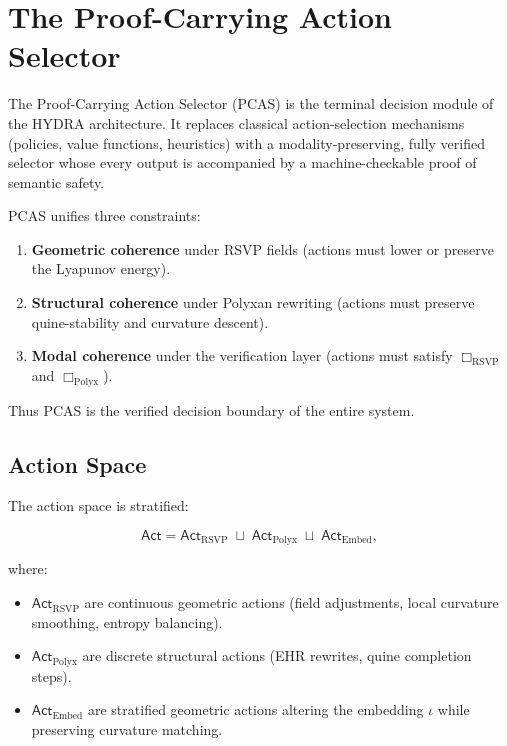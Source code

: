 \chapter{The Proof-Carrying Action Selector}
\label{ch:50}

The Proof-Carrying Action Selector (PCAS) is the terminal decision module of the
HYDRA architecture.  
It replaces classical action-selection mechanisms (policies, value functions,
heuristics) with a modality-preserving, fully verified selector whose every
output is accompanied by a machine-checkable proof of semantic safety.

PCAS unifies three constraints:

\begin{enumerate}
  \item \textbf{Geometric coherence} under RSVP fields  
        (actions must lower or preserve the Lyapunov energy).
  \item \textbf{Structural coherence} under Polyxan rewriting  
        (actions must preserve quine-stability and curvature descent).
  \item \textbf{Modal coherence} under the verification layer  
        (actions must satisfy $\Box_{\mathrm{RSVP}}$ and $\Box_{\mathrm{Polyx}}$).
\end{enumerate}

Thus PCAS is the verified decision boundary of the entire system.

\section{Action Space}

The action space is stratified:

\[
\mathsf{Act}
=
\mathsf{Act}_{\mathrm{RSVP}}
\;\sqcup\;
\mathsf{Act}_{\mathrm{Polyx}}
\;\sqcup\;
\mathsf{Act}_{\mathrm{Embed}},
\]

where:

\begin{itemize}
  \item $\mathsf{Act}_{\mathrm{RSVP}}$ are continuous geometric actions  
        (field adjustments, local curvature smoothing, entropy balancing).
  \item $\mathsf{Act}_{\mathrm{Polyx}}$ are discrete structural actions  
        (EHR rewrites, quine completion steps).
  \item $\mathsf{Act}_{\mathrm{Embed}}$ are stratified geometric actions  
        altering the embedding $\iota$ while preserving curvature matching.
\end{itemize}


